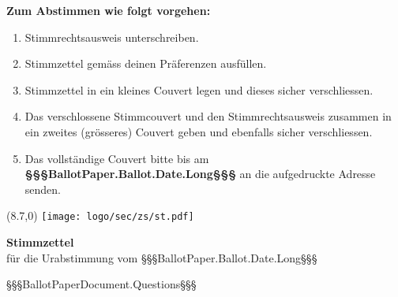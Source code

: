﻿\documentclass[11pt, a4paper]{scrartcl}
\begin{document}
\textbf{Zum Abstimmen wie folgt vorgehen:}
\begin{enumerate}
\setlength{\parskip}{0pt}
\setlength{\itemsep}{1pt}
\item Stimmrechtsausweis unterschreiben.
\item Stimmzettel gemäss deinen Präferenzen ausfüllen.
\item Stimmzettel in ein kleines Couvert legen und dieses sicher verschliessen.
\item Das verschlossene Stimmcouvert und den Stimmrechtsausweis zusammen in ein zweites (grösseres) Couvert geben und ebenfalls sicher verschliessen.
\item Das vollständige Couvert bitte bis am \textbf{§§§BallotPaper.Ballot.Date.Long§§§} an die aufgedruckte Adresse senden.
\end{enumerate}

\newpage

\begin{textblock}{6}(8.7,0)
\texttt{[image: logo/sec/zs/st.pdf]}
\end{textblock}

{\LARGE\textbf{Stimmzettel}} \\
für die Urabstimmung vom §§§BallotPaper.Ballot.Date.Long§§§ \\

\vspace{2cm}

§§§BallotPaperDocument.Questions§§§
\end{document}
